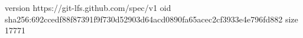 version https://git-lfs.github.com/spec/v1
oid sha256:692ccedf88f87391f9f730d52903d64acd0890fa65acec2cf3933e4e796fd882
size 17771

